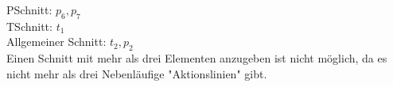 PSchnitt: $p_6,p_7$\\
TSchnitt: $t_1$\\
Allgemeiner Schnitt: $t_2,p_2$\\

Einen Schnitt mit mehr als drei Elementen anzugeben ist nicht möglich, da es nicht mehr als drei Nebenläufige "{}Aktionslinien"{} gibt.